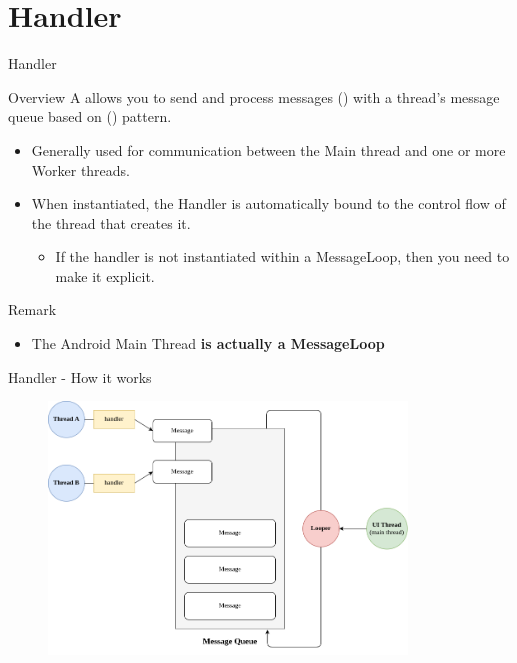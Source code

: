 \documentclass{beamer}
\begin{document}
\section{Handler}

  \begin{frame}{Handler}
    \begin{block}{Overview}
      A  allows you to send and process messages
      () with a thread's message queue based on
       () pattern. 
      \begin{itemize}
        \item Generally used for communication between the Main thread and one or
        more Worker threads.
        \item When instantiated, the Handler is automatically bound to the control
        flow of the thread that creates it.
        \begin{itemize}
          \item If the handler is not instantiated within a MessageLoop, then
          you need to make it explicit.
        \end{itemize}
      \end{itemize}
    \end{block}
    \begin{block}{Remark}
      \begin{itemize}
        \item The Android Main Thread \textbf{is actually a MessageLoop}
      \end{itemize}
    \end{block}
  \end{frame}

  \begin{frame}{Handler - How it works}
    \begin{figure}
     \includegraphics[width=0.85\textwidth]{figures/android-looper.png}
   \end{figure}
  \end{frame}
\end{document}
